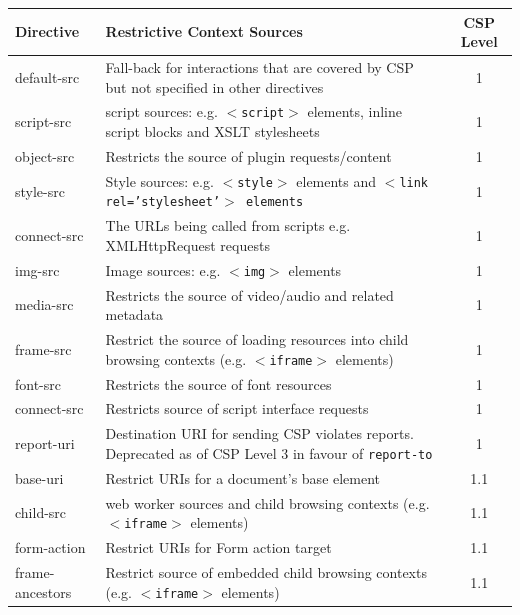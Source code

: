 \documentclass{mscreport}
\begin{document}
\begin{table}[h!]
  \begin{center}
    \begin{tabular}{|l|J|c|}  %
      \hline
      \textbf{Directive} & \textbf{Restrictive Context Sources} & \textbf{CSP Level}\\
      \hline
      default-src & Fall-back for interactions that are covered by CSP but not specified in other directives & 1\\
      \hline
      script-src & script sources: e.g. \texttt{$<$script$>$} elements, inline script blocks and XSLT stylesheets & 1 \\
      \hline
      object-src & Restricts the source of plugin requests/content & 1 \\
      \hline
      style-src & Style sources: e.g. \texttt{$<$style$>$} elements and \texttt{$<$link rel='stylesheet'$>$ elements} & 1\\
      \hline
      connect-src & The URLs being called from scripts e.g. XMLHttpRequest requests & 1 \\
      \hline
      img-src & Image sources: e.g. \texttt{$<$img$>$} elements & 1\\
      \hline
      media-src & Restricts the source of video/audio and related metadata & 1\\
      \hline
      frame-src & Restrict the source of loading resources into child browsing contexts (e.g. \texttt{$<$iframe$>$} elements) & 1\\
      \hline
      font-src & Restricts the source of font resources & 1\\
      \hline
      connect-src & Restricts source of script interface requests & 1\\
      \hline
      report-uri & Destination URI for sending CSP violates reports. Deprecated as of CSP Level 3 in favour of \texttt{report-to} & 1\\
      \hline
      base-uri & Restrict URIs for a document's base element & 1.1\\
      \hline
      child-src & web worker sources and child browsing contexts (e.g. \texttt{$<$iframe$>$} elements) & 1.1\\
      \hline
      form-action & Restrict URIs for Form action target & 1.1\\
      \hline
      frame-ancestors & Restrict source of embedded child browsing contexts (e.g. \texttt{$<$iframe$>$} elements) & 1.1\\

\end{tabular}
\end{center}
\end{table}
\end{document}

